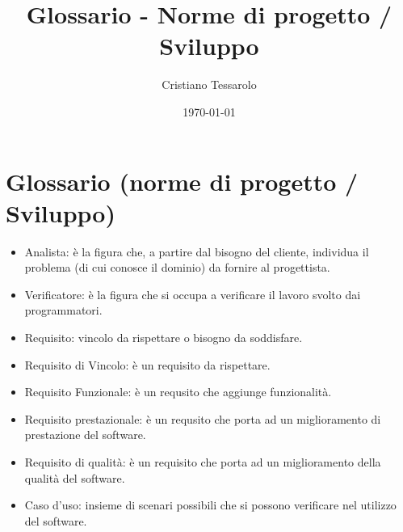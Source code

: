 \documentclass[openany,12pt,a4paper]{report}
\title{Glossario - Norme di progetto / Sviluppo}
\author{Cristiano Tessarolo}
\date{\today}
\begin{document}
\chapter{Glossario (norme di progetto / Sviluppo)}

\begin{itemize}
	
	\item{Analista}: è la figura che, a partire dal bisogno del cliente, individua il problema (di cui conosce il dominio) da fornire al progettista.
	
	\item{Verificatore}: è la figura che si occupa a verificare il lavoro svolto dai programmatori.
	
	\item{Requisito}: vincolo da rispettare o bisogno da soddisfare.
	
	\item{Requisito di Vincolo}: è un requisito da rispettare.
	
	\item{Requisito Funzionale}: è un requsito che aggiunge funzionalità.
	
	\item{Requisito prestazionale}: è un requsito che porta ad un miglioramento di prestazione del software.
	
	\item{Requisito di qualità}: è un requisito che porta ad un miglioramento della qualità del software.
	
	\item{Caso d'uso}: insieme di scenari possibili che si possono verificare nel	utilizzo del software.
	    
 
\end{itemize}
\end{document}
